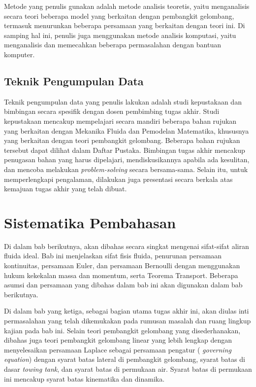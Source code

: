 \documentclass[12pt,a4paper]{report}
\begin{document}
Metode yang penulis gunakan adalah metode analisis teoretis, yaitu
menganalisis secara teori beberapa model yang berkaitan dengan pembangkit
gelombang, termasuk menurunkan beberapa persamaan yang berkaitan dengan
teori ini. Di samping hal ini, penulis juga menggunakan metode analisis
komputasi, yaitu menganalisis dan memecahkan beberapa permasalahan dengan
bantuan komputer.

\subsection{Teknik Pengumpulan Data}

Teknik pengumpulan data yang penulis lakukan adalah studi
kepustakaan dan bimbingan secara spesifik dengan dosen pembimbing
tugas akhir. Studi kepustakaan mencakup mempelajari secara
mandiri beberapa bahan rujukan yang berkaitan dengan Mekanika
Fluida dan Pemodelan Matematika, khususnya yang berkaitan dengan
teori pembangkit gelombang. Beberapa bahan rujukan tersebut dapat
dilihat dalam Daftar Pustaka. Bimbingan tugas akhir mencakup
penugasan bahan yang harus dipelajari, mendiskusikannya apabila
ada kesulitan, dan mencoba melakukan \textit{problem-solving}
secara bersama-sama. Selain itu, untuk memperlengkapi pengalaman,
dilakukan juga presentasi secara berkala atas kemajuan tugas
akhir yang telah dibuat.

\section{Sistematika Pembahasan}

Di dalam bab berikutnya, akan dibahas secara singkat mengenai sifat-sifat
aliran fluida ideal. Bab ini menjelaskan sifat fisis fluida, penurunan
persamaan kontinuitas, persamaan Euler, dan persamaan Bernoulli dengan
menggunakan hukum kekekalan massa dan momentum, serta Teorema Transport.
Beberapa asumsi dan persamaan yang dibahas dalam bab ini akan digunakan
dalam bab berikutnya.

Di dalam bab yang ketiga, sebagai bagian utama tugas akhir ini, akan diulas
inti permasalahan yang telah dikemukakan pada rumusan masalah dan ruang
lingkup kajian pada bab ini. Selain teori pembangkit gelombang yang
disederhanakan, dibahas juga teori pembangkit gelombang linear yang lebih
lengkap dengan menyelesaikan persamaan Laplace sebagai persamaan pengatur (%
\textit{governing equation}) dengan syarat batas lateral di pembangkit
gelombang, syarat batas di dasar \textit{towing tank}, dan syarat batas di
permukaan air. Syarat batas di permukaan ini mencakup syarat batas
kinematika dan dinamika.
\end{document}
